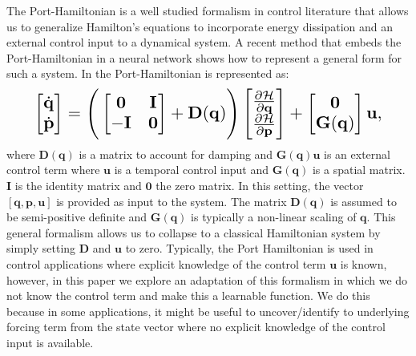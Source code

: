 \documentclass{article}
\begin{document}
The Port-Hamiltonian \cite{sanz-sole_port-hamiltonian_2007,acosta_interconnection_2005,zheng_time-varying_2018,cherifi_overview_2020} is a well studied formalism in control literature that allows us to generalize Hamilton's equations to incorporate energy dissipation and an external control input to a dynamical system. A recent method that embeds the Port-Hamiltonian in a neural network \cite{zhong_dissipative_2020} shows how to represent a general form for such a system. In \cite{zhong_dissipative_2020} the Port-Hamiltonian is represented as:
\begin{equation}
\resizebox{0.9\linewidth}{!}{$%
\begin{bmatrix}
\dot{\mathbf{q}} \\
\dot{\mathbf{p}}
\end{bmatrix}
=
\Bigg(\begin{bmatrix}
\mathbf{0} & \mathbf{I} \\
-\mathbf{I} & \mathbf{0}
\end{bmatrix} +
\mathbf{D}(\mathbf{q})
 \Bigg)
 \begin{bmatrix}
\frac{\partial \mathcal{H}}{\partial \mathbf{q}} \\
\frac{\partial \mathcal{H}}{\partial \mathbf{p}}
\end{bmatrix}
+
\begin{bmatrix}
\mathbf{0} \\
\mathbf{G}(\mathbf{q})
\end{bmatrix}
\mathbf{u},
$%
}%
\label{eqn.pham}
\end{equation}
where $\mathbf{D}(\mathbf{q})$ is a matrix to account for damping and $\mathbf{G}(\mathbf{q})\mathbf{u}$ is an external control term where $\mathbf{u}$ is a temporal control input and $\mathbf{G}(\mathbf{q})$ is a spatial matrix. $\mathbf{I}$ is the identity matrix and $\mathbf{0}$ the zero matrix. In this setting, the vector $[\mathbf{q},\mathbf{p},\mathbf{u}]$ is provided as input to the system. The matrix $\mathbf{D}(\mathbf{q})$ is assumed to be semi-positive definite and $\mathbf{G}(\mathbf{q})$ is typically a non-linear scaling of $\mathbf{q}$. This general formalism allows us to collapse to a classical Hamiltonian system by simply setting $\mathbf{D}$ and $\mathbf{u}$ to zero. Typically, the Port Hamiltonian is used in control applications where explicit knowledge of the control term $\mathbf{u}$ is known, however, in this paper we explore an adaptation of this formalism in which we do not know the control term and make this a learnable function. We do this because in some applications, it might be useful to uncover/identify to underlying forcing term from the state vector where no explicit knowledge of the control input is available. 
\end{document}
